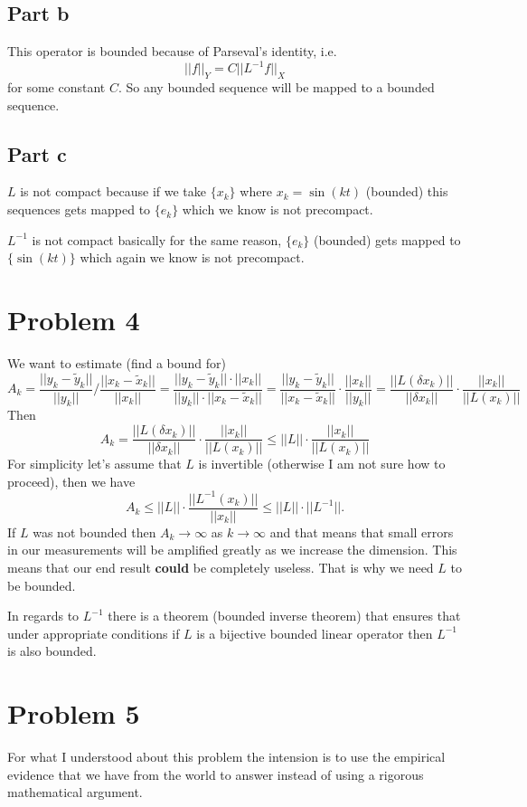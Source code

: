 \documentclass[12pt]{article}%
\begin{document}
\subsection*{Part b}
This operator is bounded because of Parseval's identity, i.e.
\[
	||f||_Y=C||L^{-1}f||_X
\]
for some constant $C$. So any bounded sequence will be mapped to a
bounded sequence.
\subsection*{Part c}
$L$ is not compact because if we take $\{x_k\}$ where $x_k=\sin(kt)$ (bounded)
this sequences gets mapped to $\{e_k\}$ which we know is not precompact.

$L^{-1}$ is not compact basically for the same reason, $\{e_k\}$ (bounded) gets
mapped to $\{\sin(kt)\}$ which again we know is not precompact.
\section*{Problem 4}
We want to estimate (find a bound for)
\[
	A_k
	=\frac{||y_k-\tilde{y}_k||}{||y_k||}\bigg/\frac{||x_k-\tilde{x}_k||}{||x_k||}
	=\frac{||y_k-\tilde{y}_k||\cdot||x_k||}{||y_k||\cdot||x_k-\tilde{x}_k||}
	=\frac{||y_k-\tilde{y}_k||}{||x_k-\tilde{x}_k||} \cdot
	\frac{||x_k||}{||y_k||}
	=\frac{||L(\delta x_k)||}{||\delta x_k||} \cdot \frac{||x_k||}{||L(x_k)||}
\]
Then
\[
A_k=\frac{||L(\delta x_k)||}{||\delta x_k||} \cdot \frac{||x_k||}{||L(x_k)||}\leq
||L||\cdot \frac{||x_k||}{||L(x_k)||}
\]
For simplicity let's assume that $L$ is invertible (otherwise I am not sure how
to proceed), then we have
\[
A_k\leq
||L||\cdot \frac{||L^{-1}(x_k)||}{||x_k||} \leq ||L|| \cdot ||L^{-1}||.
\]
If $L$ was not bounded then $A_k \to \infty$ as $k \to \infty$ and that means
that small errors in our measurements will be amplified greatly as we increase
the dimension. This means that our end result \textbf{could} be completely
useless. That is why we need $L$ to be bounded.

In regards to $L^{-1}$ there is a theorem (bounded inverse theorem) that
ensures that under appropriate conditions if $L$ is a bijective bounded linear
operator then $L^{-1}$ is also bounded.
\section*{Problem 5}
For what I understood about this problem the intension is to use the empirical
evidence that we have from the world to answer instead of using a rigorous
mathematical argument.
\end{document}
